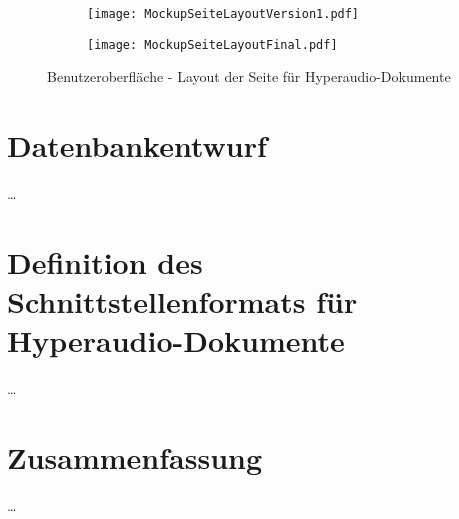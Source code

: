 \begin{figure}[h!]
\begin{subfigure}[c]{\textwidth}
\texttt{[image: MockupSeiteLayoutVersion1.pdf]}
\label{fig:MockupSeiteLayoutVersion1}
\end{subfigure}
\par\bigskip
\begin{subfigure}[c]{\textwidth}
\texttt{[image: MockupSeiteLayoutFinal.pdf]}
\label{fig:MockupSeiteLayoutFinal}
\end{subfigure}
\caption{Benutzeroberfläche - Layout der Seite für Hyperaudio-Dokumente}
\label{fig:MockupSeiteLayout}
\end{figure}





\section{Datenbankentwurf}
\dots


\section{Definition des Schnittstellenformats für Hyperaudio-Dokumente}
\dots

\section{Zusammenfassung}
\dots
